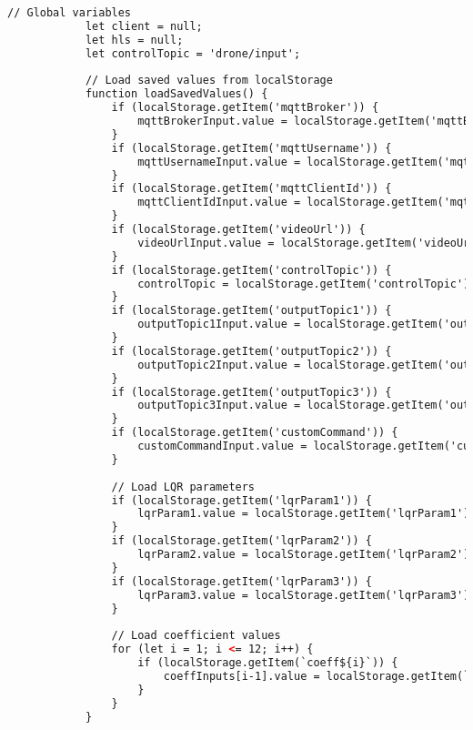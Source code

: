 \begin{lstlisting}[language=html]
            // Global variables
            let client = null;
            let hls = null;
            let controlTopic = 'drone/input';
            
            // Load saved values from localStorage
            function loadSavedValues() {
                if (localStorage.getItem('mqttBroker')) {
                    mqttBrokerInput.value = localStorage.getItem('mqttBroker');
                }
                if (localStorage.getItem('mqttUsername')) {
                    mqttUsernameInput.value = localStorage.getItem('mqttUsername');
                }
                if (localStorage.getItem('mqttClientId')) {
                    mqttClientIdInput.value = localStorage.getItem('mqttClientId');
                }
                if (localStorage.getItem('videoUrl')) {
                    videoUrlInput.value = localStorage.getItem('videoUrl');
                }
                if (localStorage.getItem('controlTopic')) {
                    controlTopic = localStorage.getItem('controlTopic');
                }
                if (localStorage.getItem('outputTopic1')) {
                    outputTopic1Input.value = localStorage.getItem('outputTopic1');
                }
                if (localStorage.getItem('outputTopic2')) {
                    outputTopic2Input.value = localStorage.getItem('outputTopic2');
                }
                if (localStorage.getItem('outputTopic3')) {
                    outputTopic3Input.value = localStorage.getItem('outputTopic3');
                }
                if (localStorage.getItem('customCommand')) {
                    customCommandInput.value = localStorage.getItem('customCommand');
                }
                
                // Load LQR parameters
                if (localStorage.getItem('lqrParam1')) {
                    lqrParam1.value = localStorage.getItem('lqrParam1');
                }
                if (localStorage.getItem('lqrParam2')) {
                    lqrParam2.value = localStorage.getItem('lqrParam2');
                }
                if (localStorage.getItem('lqrParam3')) {
                    lqrParam3.value = localStorage.getItem('lqrParam3');
                }
                
                // Load coefficient values
                for (let i = 1; i <= 12; i++) {
                    if (localStorage.getItem(`coeff${i}`)) {
                        coeffInputs[i-1].value = localStorage.getItem(`coeff${i}`);
                    }
                }
            }
    

\end{lstlisting}
